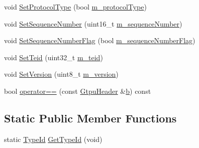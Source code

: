 \begin{DoxyCompactItemize}
\item 
void \hyperlink{classns3_1_1GtpuHeader_af7eb917193713e4c7aec4f661b9a0d68}{Set\+Protocol\+Type} (bool \hyperlink{classns3_1_1GtpuHeader_a48a7c185f083bc8da2ee925b4766c69f}{m\+\_\+protocol\+Type})
\item 
void \hyperlink{classns3_1_1GtpuHeader_a2e59425b9f6358c4f63790407427ffcf}{Set\+Sequence\+Number} (uint16\+\_\+t \hyperlink{classns3_1_1GtpuHeader_a819665f22b6dfc6492799edf4984db53}{m\+\_\+sequence\+Number})
\item 
void \hyperlink{classns3_1_1GtpuHeader_a177155359e98749daa98427c0f6b8882}{Set\+Sequence\+Number\+Flag} (bool \hyperlink{classns3_1_1GtpuHeader_ae659c2713a5a90d90312a329827f1f07}{m\+\_\+sequence\+Number\+Flag})
\item 
void \hyperlink{classns3_1_1GtpuHeader_a480c1d002a1a4f4b490c8e8c223f29f5}{Set\+Teid} (uint32\+\_\+t \hyperlink{classns3_1_1GtpuHeader_a2245b21ba4c0c28116fa3099b9cb1f44}{m\+\_\+teid})
\item 
void \hyperlink{classns3_1_1GtpuHeader_aab24b29caeb8f761c5642dd8a04b4891}{Set\+Version} (uint8\+\_\+t \hyperlink{classns3_1_1GtpuHeader_ab0bd6fd08e361f9bb35ce1160bf8b263}{m\+\_\+version})
\item 
bool \hyperlink{classns3_1_1GtpuHeader_a6ea1fe6cb181631ef9dc105a29112d23}{operator==} (const \hyperlink{classns3_1_1GtpuHeader}{Gtpu\+Header} \&\hyperlink{lte__pathloss_8m_a21ad0bd836b90d08f4cf640b4c298e7c}{b}) const 
\end{DoxyCompactItemize}
\subsection*{Static Public Member Functions}
\begin{DoxyCompactItemize}
\item 
static \hyperlink{classns3_1_1TypeId}{Type\+Id} \hyperlink{classns3_1_1GtpuHeader_a1ae0a741f80a23382815fa845cc8b4ce}{Get\+Type\+Id} (void)
\end{DoxyCompactItemize}
